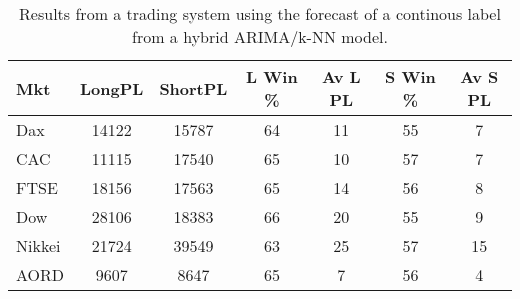 \begin{table}[ht]
\centering
\caption[Results from a trading system using the forecast of a continous label from a hybrid ARIMA/ANN model]{Results from a trading system using the forecast of a continous label from a hybrid ARIMA/k-NN model.} 
\label{tab:chp_ts:pUD_01_arima_knn_sys}
\begin{tabular}{lcccccc}
  \toprule Mkt & LongPL & ShortPL & L Win \% & Av L PL & S Win \% & Av S PL \\ 
  \midrule Dax & 14122 & 15787 & 64 & 11 & 55 & 7 \\ 
  CAC & 11115 & 17540 & 65 & 10 & 57 & 7 \\ 
  FTSE & 18156 & 17563 & 65 & 14 & 56 & 8 \\ 
  Dow & 28106 & 18383 & 66 & 20 & 55 & 9 \\ 
  Nikkei & 21724 & 39549 & 63 & 25 & 57 & 15 \\ 
  AORD & 9607 & 8647 & 65 & 7 & 56 & 4 \\ 
   \bottomrule \end{tabular}
\end{table}
